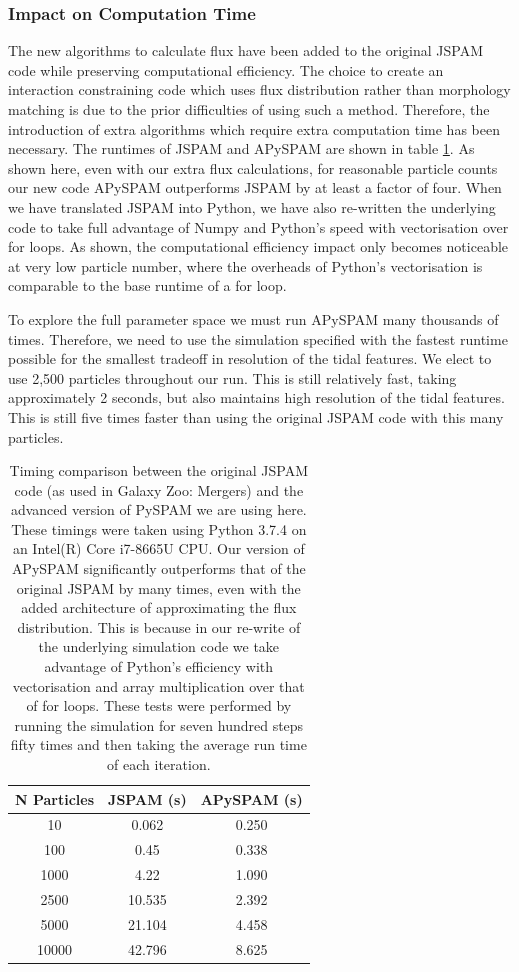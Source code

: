 \subsubsection{Impact on Computation Time}
The new algorithms to calculate flux have been added to the original JSPAM code while preserving computational efficiency. The choice to create an interaction constraining code which uses flux distribution rather than morphology matching is due to the prior difficulties of using such a method. Therefore, the introduction of extra algorithms which require extra computation time has been necessary. The runtimes of JSPAM and APySPAM are shown in table \ref{tab:timings}. As shown here, even with our extra flux calculations, for reasonable particle counts our new code APySPAM outperforms JSPAM by at least a factor of four. When we have translated JSPAM into Python, we have also re-written the underlying code to take full advantage of Numpy and Python's speed with vectorisation over for loops.  As shown, the computational efficiency impact only becomes noticeable at very low particle number, where the overheads of Python's vectorisation is comparable to the base runtime of a for loop.

To explore the full parameter space we must run APySPAM many thousands of times. Therefore, we need to use the simulation specified with the fastest runtime possible for the smallest tradeoff in resolution of the tidal features. We elect to use 2,500 particles throughout our run. This is still relatively fast, taking approximately 2 seconds, but also maintains high resolution of the tidal features. This is still five times faster than using the original JSPAM code with this many particles. 

\begin{table}
    \centering
    \begin{tabular}{|c|c|c|}
    \hline
        N Particles & JSPAM (s) & APySPAM (s)  \\
        \hline
        10 & 0.062 & 0.250 \\
        100 & 0.45 &  0.338 \\
        1000 & 4.22 & 1.090 \\
        2500 & 10.535 & 2.392 \\
        5000 & 21.104 & 4.458 \\
        10000 & 42.796 & 8.625 \\
        \hline
    \end{tabular}
    \caption{Timing comparison between the original JSPAM code (as used in Galaxy Zoo: Mergers) and the advanced version of PySPAM we are using here. These timings were taken using Python 3.7.4 on an Intel(R) Core i7-8665U CPU. Our version of APySPAM significantly outperforms that of the original JSPAM by many times, even with the added architecture of approximating the flux distribution. This is because in our re-write of the underlying simulation code we take advantage of Python's efficiency with vectorisation and array multiplication over that of for loops. These tests were performed by running the simulation for seven hundred steps fifty times and then taking the average run time of each iteration.}
    \label{tab:timings}
\end{table}

